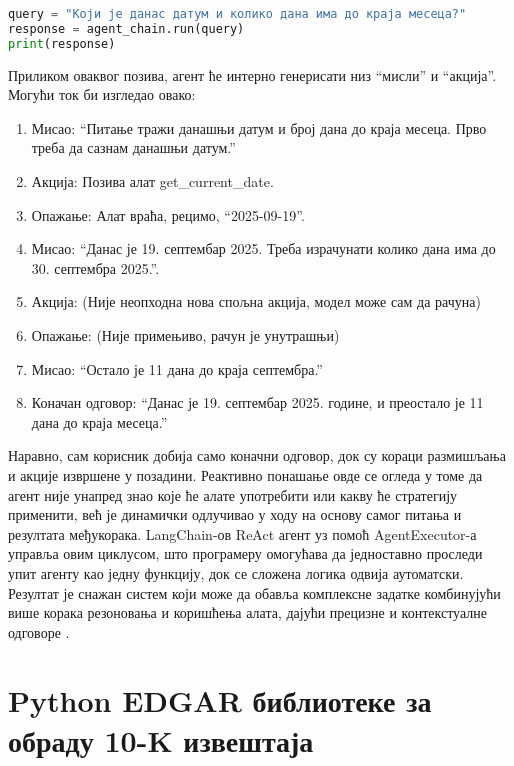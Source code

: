\begin{lstlisting}[language=Python, caption={Покретање ReAct агента}, label={lst:run_react_agent}]
query = "Који је данас датум и колико дана има до краја месеца?"
response = agent_chain.run(query)
print(response)
\end{lstlisting}

Приликом оваквог позива, агент ће интерно генерисати низ ``мисли'' и ``акција''. Могући ток би изгледао овако:
\begin{enumerate}
    \item Мисао: ``Питање тражи данашњи датум и број дана до краја месеца. Прво треба да сазнам данашњи датум.''
    \item Акција: Позива алат get\_current\_date.
    \item Опажање: Алат враћа, рецимо, ``2025-09-19''.
    \item Мисао: ``Данас је 19. септембар 2025. Треба израчунати колико дана има до 30. септембра 2025.''.
    \item Акција: (Није неопходна нова спољна акција, модел може сам да рачуна)
    \item Опажање: (Није примењиво, рачун је унутрашњи)
    \item Мисао: ``Остало је 11 дана до краја септембра.''
    \item Коначан одговор: ``Данас је 19. септембар 2025. године, и преостало је 11 дана до краја месеца.''
\end{enumerate}

Наравно, сам корисник добија само коначни одговор, док су кораци размишљања и акције извршене у позадини. Реактивно понашање овде се огледа у томе да агент није унапред знао које ће алате употребити или какву ће стратегију применити, већ је динамички одлучивао у ходу на основу самог питања и резултата међукорака. LangChain-ов ReAct агент уз помоћ AgentExecutor-а управља овим циклусом, што програмеру омогућава да једноставно проследи упит агенту као једну функцију, док се сложена логика одвија аутоматски. Резултат је снажан систем који може да обавља комплексне задатке комбинујући више корака резоновања и коришћења алата, дајући прецизне и контекстуалне одговоре \cite{langchain_docs_2024}.



\section{Python EDGAR библиотеке за обраду 10-K извештаја}

